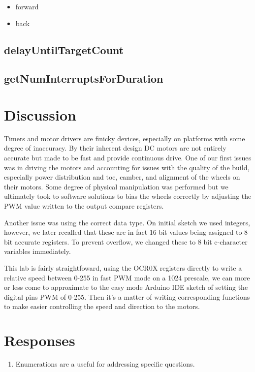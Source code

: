 \documentclass[letterpaper,11pt]{texMemo} %
\begin{document}
\begin{itemize}
    \item forward
    \item back
\end{itemize}

\subsection*{delayUntilTargetCount}

\subsection*{getNumInterruptsForDuration}

\section*{Discussion}
Timers and motor drivers are finicky devices, especially on platforms with 
some degree of inaccuracy. By their inherent design DC motors are not entirely 
accurate but made to be fast and provide continuous drive. One of our first 
issues was in driving the motors and accounting for issues with the quality 
of the build, especially power distribution and toe, camber, and alignment of 
the wheels on their motors. Some degree of physical manipulation was performed 
but we ultimately took to software solutions to bias the wheels correctly by 
adjusting the PWM value written to the output compare registers.

Another issue was using the correct data type. On initial sketch we used integers, 
however, we later recalled that these are in fact 16 bit values being assigned to 
8 bit accurate registers. To prevent overflow, we changed these to 8 bit c-character 
variables immediately.

This lab is fairly straightfoward, using the OCR0X registers directly to write a 
relative speed between 0-255 in fast PWM mode on a 1024 prescale, we can more or 
less come to approximate to the easy mode Arduino IDE sketch of setting the digital 
pins PWM of 0-255. Then it's a matter of writing corresponding functions to 
make easier controlling the speed and direction to the motors.

\section*{Responses}
\begin{enumerate}
\item Enumerations are a useful for addressing specific questions.
\end{enumerate} 
\end{document}
